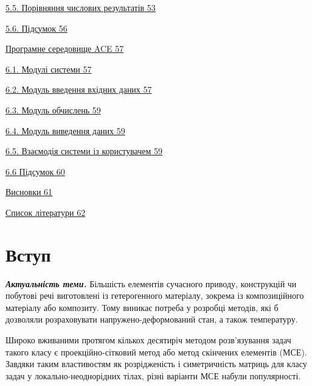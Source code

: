 \protect\hyperlink{ux43fux43eux440ux456ux432ux43dux44fux43dux43dux44f-ux447ux438ux441ux43bux43eux432ux438ux445-ux440ux435ux437ux443ux43bux44cux442ux430ux442ux456ux432-1}{5.5.
Порівняння числових результатів 53}

\protect\hyperlink{ux43fux456ux434ux441ux443ux43cux43eux43a-3}{5.6.
Підсумок 56}

\protect\hyperlink{ux43fux440ux43eux433ux440ux430ux43cux43dux435-ux441ux435ux440ux435ux434ux43eux432ux438ux449ux435-ace}{Програмне
середовище ACE 57}

\protect\hyperlink{ux43cux43eux434ux443ux43bux456-ux441ux438ux441ux442ux435ux43cux438}{6.1.
Модулі системи 57}

\protect\hyperlink{ux43cux43eux434ux443ux43bux44c-ux432ux432ux435ux434ux435ux43dux43dux44f-ux434ux430ux43dux438ux445}{6.2.
Модуль введення вхідних даних 57}

\protect\hyperlink{ux43cux43eux434ux443ux43bux44c-ux43eux431ux447ux438ux441ux43bux435ux43dux44c}{6.3.
Модуль обчислень 59}

\protect\hyperlink{ux43cux43eux434ux443ux43bux44c-ux432ux438ux432ux435ux434ux435ux43dux43dux44f-ux434ux430ux43dux438ux445}{6.4.
Модуль виведення даних 59}

\protect\hyperlink{ux432ux437ux430ux454ux43cux43eux434ux456ux44f-ux441ux438ux441ux442ux435ux43cux438-ux456ux437-ux43aux43eux440ux438ux441ux442ux443ux432ux430ux447ux435ux43c}{6.5.
Взаємодія системи із користувачем 59}

\protect\hyperlink{ux43fux456ux434ux441ux443ux43cux43eux43a-4}{6.6
Підсумок 60}

\protect\hyperlink{ux432ux438ux441ux43dux43eux432ux43aux438}{Висновки
61}

\protect\hyperlink{ux441ux43fux438ux441ux43eux43a-ux43bux456ux442ux435ux440ux430ux442ux443ux440ux438}{Список
літератури 62}

\hypertarget{ux432ux441ux442ux443ux43f}{%
\section{Вступ}\label{ux432ux441ux442ux443ux43f}}

\emph{\textbf{Актуальність теми.}} Більшість елементів сучасного
приводу, конструкцій чи побутові речі виготовлені із гетерогенного
матеріалу, зокрема із композиційного матеріалу або композиту. Тому
виникає потреба у розробці методів, які б дозволяли розраховувати
напружено-деформований стан, а також температуру.

Широко вживаними протягом кількох десятиріч методом розв'язування задач
такого класу є проекційно-сітковий метод або метод скінчених елементів
(МСЕ). Завдяки таким властивостям як розрідженість і симетричність
матриць для класу задач у локально-неоднорідних тілах, різні варіанти
МСЕ набули популярності.

